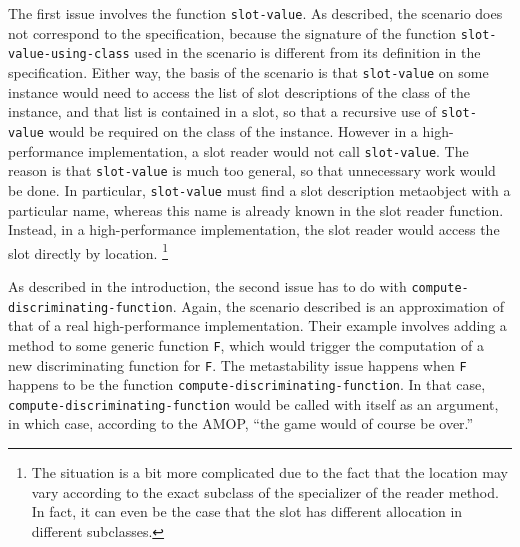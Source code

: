 The first issue involves the function \texttt{slot-value}.  As
described, the scenario does not correspond to the specification,
because the signature of the function \texttt{slot-value-using-class}
used in the scenario is different from its definition in the
specification.  Either way, the basis of the scenario is that
\texttt{slot-value} on some instance would need to access the list of
slot descriptions of the class of the instance, and that list is
contained in a slot, so that a recursive use of \texttt{slot-value}
would be required on the class of the instance.  However in a
high-performance implementation, a slot reader would not call
\texttt{slot-value}.  The reason is that \texttt{slot-value} is much
too general, so that unnecessary work would be done.  In particular, 
\texttt{slot-value} must find a slot description metaobject with a
particular name, whereas this name is already known in the slot
reader function.  Instead, in a high-performance implementation, the
slot reader would access the slot directly by location.%
\footnote{The situation is a bit more complicated due to the fact that
  the location may vary according to the exact subclass of the
  specializer of the reader method.  In fact, it can even be the case
  that the slot has different allocation in different subclasses.}

As described in the introduction, the second issue has to do with
\texttt{compute-discriminating-function}.  Again, the scenario
described is an approximation of that of a real high-performance
implementation.  Their example involves adding a method to some
generic function \texttt{F}, which would trigger the computation of a
new discriminating function for \texttt{F}.  The metastability issue
happens when \texttt{F} happens to be the function
\texttt{compute-discriminating-function}.  In that case,
\texttt{compute-discriminating-function} would be called with itself
as an argument, in which case, according to the AMOP, ``the game would
of course be over.''



